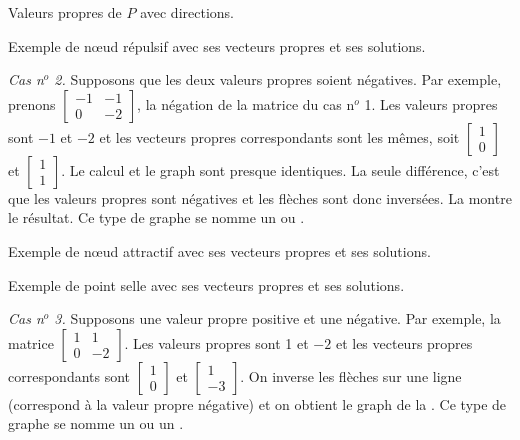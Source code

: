 \begin{myfig}
\parbox[t]{3.0in}{
 \capstart
 \caption{Valeurs propres de $P$ avec directions.\label{pln:source-eig-arrfig}}
}
\quad
\parbox[t]{3.0in}{
 \capstart
 \caption{Exemple de nœud répulsif avec ses vecteurs propres et ses
 solutions.\label{pln:source-fullfig}}
}
\end{myfig}

\medskip

\emph{Cas n$^o$ 2.} Supposons que les deux valeurs propres soient négatives. Par exemple, prenons
$\left[ \begin{smallmatrix} -1 & -1 \\ 0 & -2 \end{smallmatrix} \right]$, la négation de la matrice du cas n$^o$ 1.
Les valeurs propres sont $-1$ et $-2$ et les vecteurs propres correspondants sont les mêmes, soit
$\left[ \begin{smallmatrix} 1 \\ 0 \end{smallmatrix} \right]$ et
$\left[ \begin{smallmatrix} 1 \\ 1 \end{smallmatrix} \right]$.  Le calcul et le graph sont presque identiques. La seule différence, c’est que les valeurs propres sont négatives et les flèches sont donc inversées. La  montre le résultat. Ce type de graphe se nomme un \emph{} ou \emph{}.

\begin{myfig}
\parbox[t]{3.0in}{
 \capstart
 \caption{Exemple de nœud attractif avec ses vecteurs propres et ses
 solutions.\label{pln:sink-fullfig}}
}
\quad
\parbox[t]{3.0in}{
 \capstart
 \caption{Exemple de point selle avec ses vecteurs propres et ses
 solutions.\label{pln:saddle-fullfig}}
}
\end{myfig}

\medskip

\emph{Cas n$^o$ 3.} Supposons une valeur propre positive et une négative. Par exemple, la matrice
$\left[ \begin{smallmatrix} 1 & 1 \\ 0 & -2 \end{smallmatrix} \right]$.
Les valeurs propres sont 1 et $-2$ et les vecteurs propres correspondants sont
$\left[ \begin{smallmatrix} 1 \\ 0 \end{smallmatrix} \right]$ et
$\left[ \begin{smallmatrix} 1 \\ -3 \end{smallmatrix} \right]$.  On inverse les flèches sur une ligne (correspond à la valeur propre négative) et on obtient le graph de la .  Ce type de graphe se nomme un \emph{} ou un \emph{}.


